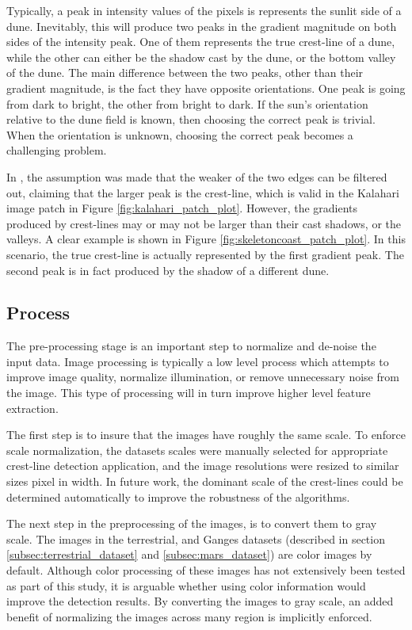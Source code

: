 Typically, a peak in intensity values of the pixels is represents the sunlit side of a dune. Inevitably, this will produce two peaks in the gradient magnitude on both sides of the intensity peak. One of them represents the true crest-line of a dune, while the other can either be the shadow cast by the dune, or the bottom valley of the dune. The main difference between the two peaks, other than their gradient magnitude, is the fact they have opposite orientations. One peak is going from dark to bright, the other from bright to dark. If the sun's orientation relative to the dune field is known, then choosing the correct peak is trivial. When the orientation is unknown, choosing the correct peak becomes a challenging problem. 

In \cite{2015_automated_mapping_of_linear_dunefield}, the assumption was made that the weaker of the two edges can be filtered out, claiming that the larger peak is the crest-line, which is valid in the Kalahari image patch in Figure \ref{fig:kalahari_patch_plot}. However, the gradients produced by crest-lines may or may not be larger than their cast shadows, or the valleys. A clear example is shown in Figure \ref{fig:skeletoncoast_patch_plot}. In this scenario, the true crest-line is actually represented by the first gradient peak. The second peak is in fact produced by the shadow of a different dune.

\subsection{Process}

The pre-processing stage is an important step to normalize and de-noise the input data. Image processing is typically a low level process which attempts to improve image quality, normalize illumination, or remove unnecessary noise from the image. This type of processing will in turn improve higher level feature extraction.

The first step is to insure that the images have roughly the same scale. To enforce scale normalization, the datasets scales were manually selected for appropriate crest-line detection application, and the image resolutions were resized to similar sizes pixel in width. In future work, the dominant scale of the crest-lines could be determined automatically to improve the robustness of the algorithms.

The next step in the preprocessing of the images, is to convert them to gray scale. The images in the terrestrial, and Ganges datasets (described in section \ref{subsec:terrestrial_dataset} and \ref{subsec:mars_dataset}) are color images by default. Although color processing of these images has not extensively been tested as part of this study, it is arguable whether using color information would improve the detection results. By converting the images to gray scale, an added benefit of normalizing the images across many region is implicitly enforced.

